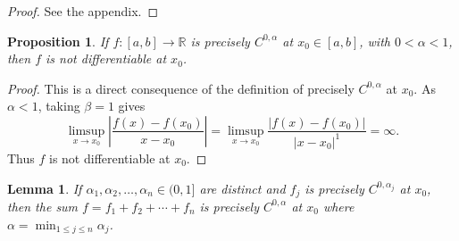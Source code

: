 \documentclass[12pt]{amsart}
\newcommand{\adj}{{precisely }} %
\numberwithin{equation}{section}
\newcommand{\R}{{\mathbb R}}		%
\newcommand{\cn}{\colon}                %
\newtheorem{lemma}[thm]{Lemma}
\newtheorem{prop}[thm]{Proposition}
\theoremstyle{definition}
\theoremstyle{remark}
\begin{document}
\begin{proof}
See the appendix.
\end{proof}


\begin{prop}\label{prop:not_diff}
    If $f\cn [a,b]\to \R$ is \adj  $C^{0,\alpha}$ at $x_0\in [a,b]$,
    with $0<\alpha<1$, then $f$ is not differentiable at $x_0$.
\end{prop}

\begin{proof}
This is a direct consequence of the definition of  \adj $C^{0,\alpha}$
at $x_0$.
As $\alpha<1$, taking $\beta= 1$ gives
$$
\limsup_{x\to x_0} \left| \frac{f(x)-f(x_0)}{x-x_0} \right|
= \limsup_{x\to x_0} \frac{|f(x)-f(x_0)|}{|x-x_0|^1}=\infty.
$$
Thus $f$ is not differentiable at $x_0$.
\end{proof}

\begin{lemma}\label{lem:sum}
If $\alpha_1, \alpha_2 ,\ldots, \alpha_n \in (0,1]$ are distinct 
and $f_j$ is \adj $C^{0,\alpha_j}$ at $x_0$, then the
sum $f=f_1 + f_2 + \cdots + f_n$ is \adj $C^{0,\alpha}$ at $x_0$
where $\alpha = \min_{1\le j \le n} 
\alpha_j$.
\end{lemma}
\end{document}
